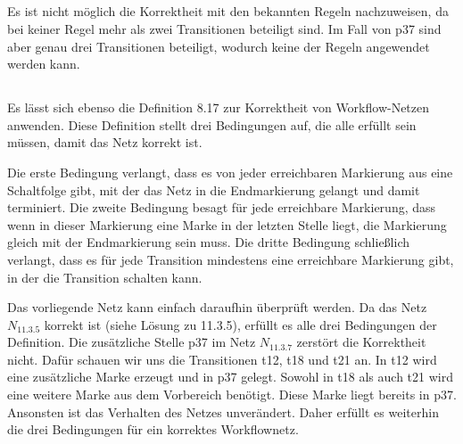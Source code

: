 \documentclass[10pt,a4paper,oneside,ngerman,numbers=noenddot]{scrartcl}
\begin{document}
\subsection{}
Es ist nicht möglich die Korrektheit mit den bekannten Regeln nachzuweisen, da bei keiner Regel mehr als zwei Transitionen beteiligt sind. Im Fall von p37 sind aber genau drei Transitionen beteiligt, wodurch keine der Regeln angewendet werden kann.

\subsection{}
Es lässt sich ebenso die Definition 8.17 zur Korrektheit von Workflow-Netzen anwenden. Diese Definition stellt drei Bedingungen auf, die alle erfüllt sein müssen, damit das Netz korrekt ist.

Die erste Bedingung verlangt, dass es von jeder erreichbaren Markierung aus eine Schaltfolge gibt, mit der das Netz in die Endmarkierung gelangt und damit terminiert. Die zweite Bedingung besagt für jede erreichbare Markierung, dass wenn in dieser Markierung eine Marke in der letzten Stelle liegt, die Markierung gleich mit der Endmarkierung sein muss. Die dritte Bedingung schließlich verlangt, dass es für jede Transition mindestens eine erreichbare Markierung gibt, in der die Transition schalten kann.

Das vorliegende Netz kann einfach daraufhin überprüft werden. Da das Netz \(N_{11.3.5}\) korrekt ist (siehe Lösung zu 11.3.5), erfüllt es alle drei Bedingungen der Definition. Die zusätzliche Stelle p37 im Netz \(N_{11.3.7}\) zerstört die Korrektheit nicht. Dafür schauen wir uns die Transitionen t12, t18 und t21 an. In t12 wird eine zusätzliche Marke erzeugt und in p37 gelegt. Sowohl in t18 als auch t21 wird eine weitere Marke aus dem Vorbereich benötigt. Diese Marke liegt bereits in p37. Ansonsten ist das Verhalten des Netzes unverändert. Daher erfüllt es weiterhin die drei Bedingungen für ein korrektes Workflownetz.
\end{document}
